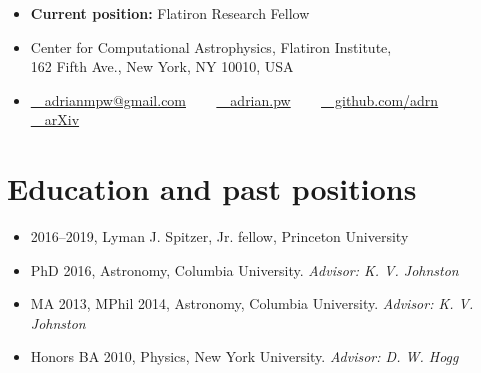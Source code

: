 \documentclass[12pt, letterpaper]{apw-cv}
\begin{document}
\thispagestyle{empty}\sloppy\sloppypar




\begin{itemize}
  \item \textbf{Current position:} Flatiron Research Fellow
  \item Center for Computational Astrophysics, Flatiron Institute, \\ 162 Fifth Ave., New York, NY 10010, USA
  \item
    \href{mailto:adrianmpw@gmail.com}{\faEnvelope~~adrianmpw@gmail.com}
    ~~~
	\href{http://adrian.pw}{\faExternalLink~~adrian.pw}
    ~~~
	\href{https://github.com/adrn}{\faGithub~~github.com/adrn}
    ~~~
    \href{\arxivurl}{~~arXiv}
\end{itemize}




\section*{Education and past positions}
	\begin{itemize}
        \item 2016--2019, Lyman J. Spitzer, Jr. fellow, Princeton University
	\item PhD 2016, Astronomy, Columbia University.
		{\it Advisor: K. V. Johnston}
	\item MA 2013, MPhil 2014, Astronomy, Columbia University.
		{\it Advisor: K. V. Johnston}
	\item Honors BA 2010, Physics, New York University.
		{\it Advisor: D. W. Hogg}
	\end{itemize}
\end{document}
